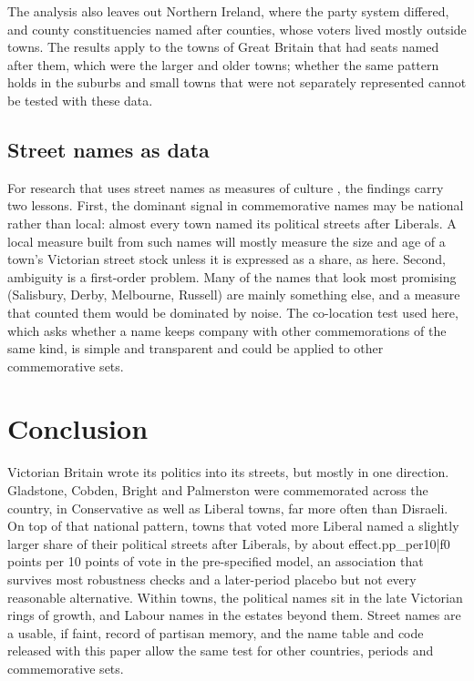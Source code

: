 \documentclass[11pt,a4paper]{article}
\begin{document}
The analysis also leaves out Northern Ireland, where the party system differed, and county constituencies named after counties, whose voters lived mostly outside towns. The results apply to the towns of Great Britain that had seats named after them, which were the larger and older towns; whether the same pattern holds in the suburbs and small towns that were not separately represented cannot be tested with these data.

\subsection{Street names as data}
For research that uses street names as measures of culture \citep{oto2018,gutierrez2022,bancilhon2021}, the findings carry two lessons. First, the dominant signal in commemorative names may be national rather than local: almost every town named its political streets after Liberals. A local measure built from such names will mostly measure the size and age of a town's Victorian street stock unless it is expressed as a share, as here. Second, ambiguity is a first-order problem. Many of the names that look most promising (Salisbury, Derby, Melbourne, Russell) are mainly something else, and a measure that counted them would be dominated by noise. The co-location test used here, which asks whether a name keeps company with other commemorations of the same kind, is simple and transparent and could be applied to other commemorative sets.

\section{Conclusion}
Victorian Britain wrote its politics into its streets, but mostly in one direction. Gladstone, Cobden, Bright and Palmerston were commemorated across the country, in Conservative as well as Liberal towns, far more often than Disraeli. On top of that national pattern, towns that voted more Liberal named a slightly larger share of their political streets after Liberals, by about {{effect.pp_per10|f0}} points per 10 points of vote in the pre-specified model, an association that survives most robustness checks and a later-period placebo but not every reasonable alternative. Within towns, the political names sit in the late Victorian rings of growth, and Labour names in the estates beyond them. Street names are a usable, if faint, record of partisan memory, and the name table and code released with this paper allow the same test for other countries, periods and commemorative sets.
\end{document}
